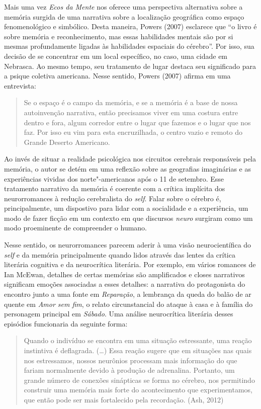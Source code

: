 Mais uma vez \emph{Ecos da Mente} nos oferece uma perspectiva
alternativa sobre a memória surgida de uma narrativa sobre a localização
geográfica como espaço fenomenológico e simbólico. Desta maneira, Powers
(2007) esclarece que ``o livro é sobre memória e reconhecimento, mas
essas habilidades mentais são por si mesmas profundamente ligadas às
habilidades espaciais do cérebro''. Por isso, sua decisão de se
concentrar em um local específico, no caso, uma cidade em Nebrasca. Ao
mesmo tempo, seu tratamento de lugar destaca seu significado para a
psique coletiva americana. Nesse sentido, Powers (2007) afirma em uma
entrevista:

\begin{quote}
Se o espaço é o campo da memória, e se a memória é a base de nossa
autoinvenção narrativa, então precisamos viver em uma costura entre
dentro e fora, algum corredor entre o lugar que fazemos e o lugar que
nos faz. Por isso eu vim para esta encruzilhada, o centro vazio e remoto
do Grande Deserto Americano.
\end{quote}

Ao invés de situar a realidade psicológica nos circuitos cerebrais
responsáveis pela memória, o autor se detém em uma reflexão sobre as
geografias imaginárias e as experiências vividas dos norte"-americanos
após o 11 de setembro. Esse tratamento narrativo da memória é coerente
com a crítica implícita dos neurorromances à redução cerebralista do
\emph{self}. Falar sobre o cérebro é, principalmente, um dispostivo para lidar
com a socialidade e a experiência, um modo de fazer ficção em um
contexto em que discursos \emph{neuro} surgiram como um modo proeminente
de compreender o humano.

Nesse sentido, os neurorromances parecem aderir à uma visão
neurocientífica do \emph{self} e da memória principalmente quando lidos através
das lentes da crítica literária cognitiva e da neurocrítica literária.
Por exemplo, em vários romances de Ian McEwan, detalhes de certas
memórias são amplificados e closes narrativos significam emoções
associadas a esses detalhes: a narrativa do protagonista do encontro
junto a uma fonte em \emph{Reparação}, a lembrança da queda do balão de
ar quente em \emph{Amor sem fim}, o relato circunstancial do ataque à
casa e à família do personagem principal em \emph{Sábado}. Uma análise
neurocrítica literária desses episódios funcionaria da seguinte forma:

\begin{quote}
Quando o indivíduo se encontra em uma situação estressante, uma reação
instintiva é deflagrada. (\ldots{}) Essa reação sugere que em situações nas
quais nos estressamos, nossos neurônios processam mais informação do que
fariam normalmente devido à produção de adrenalina. Portanto, um grande
número de conexões sinápticas se forma no cérebro, nos permitindo
construir uma memória mais forte do acontecimento que experimentamos,
que então pode ser mais fortalecido pela recordação. (Ash, 2012)
\end{quote}

